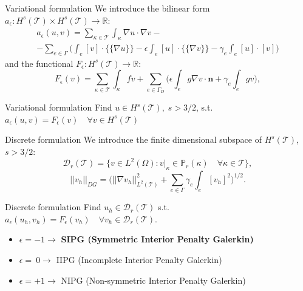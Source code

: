 \documentclass{beamer}
\begin{document}
\begin{frame}{Variational formulation}
	We introduce the bilinear form
	$a_\epsilon: H^s(\mathcal{T}) \times H^s(\mathcal{T}) \rightarrow
	\mathbb{R}$:
	\begin{multline*}
	a_\epsilon(u, v) = \sum_{\kappa \in \mathcal{T}} \int_\kappa \nabla u \cdot
	\nabla v -\\
	-\sum_{e \in \Gamma} \bigg( \int_e [v] \cdot \{\!\!\{ \nabla u \}\!\!\}
	-\epsilon \int_e [u] \cdot \{\!\!\{ \nabla v \}\!\!\}
	- \gamma_e \int_e [u]\cdot[v] \bigg)
	\end{multline*}
	and the functional $F_\epsilon: H^s(\mathcal{T}) \rightarrow \mathbb{R}$:
	\begin{equation*}
	F_\epsilon(v) = \sum_{\kappa \in \mathcal{T}} \int_\kappa fv
	+ \sum_{e \in \Gamma_D} \bigg( \epsilon \int_e g \nabla v \cdot \mathbf{n}
	+ \gamma_e \int_e gv \bigg),
	\end{equation*}
	\begin{block}{Variational formulation}
	Find $u \in H^s(\mathcal{T}), \; s>3/2$, s.t. $a_\epsilon(u, v) =
	F_\epsilon(v) \quad \forall v \in H^s(\mathcal{T})$
	\end{block}

\end{frame}
\begin{frame}{Discrete formulation}
	We introduce the finite dimensional subspace of $H^s(\mathcal{T})$, $s>3/2$:
	\begin{equation*}
	\mathcal{D}_r(\mathcal{T}) = \{ v \in L^2(\Omega) : v|_\kappa \in
	\mathbb{P}_r(\kappa) \quad \forall \kappa \in \mathcal{T}  \},
	\end{equation*}
	\begin{equation*}
		|\!|v_h|\!|_{DG} = \bigg( |\!|\nabla v_h|\!|^2_{L^2(\mathcal{T})} +
		\sum_{e \in \Gamma} \gamma_e \int_e [v_h]^2 \bigg)^{1/2}.
	\end{equation*}
	\begin{block}{Discrete formulation}
	Find $u_h \in \mathcal{D}_r(\mathcal{T})$ s.t. $a_\epsilon(u_h, v_h) =
	F_\epsilon(v_h) \quad \forall v_h \in \mathcal{D}_r(\mathcal{T})$.
	\end{block}
	\begin{itemize}
		\item \textbf{$\epsilon = -1 \rightarrow$} \textbf{SIPG (Symmetric 
		Interior 
		Penalty	Galerkin)}
		\item $\epsilon = ~0 \rightarrow$ IIPG (Incomplete Interior Penalty
		Galerkin)
		\item $\epsilon = +1 \rightarrow$ NIPG (Non-symmetric Interior Penalty
		Galerkin)
	\end{itemize}
\end{frame}
\end{document}
